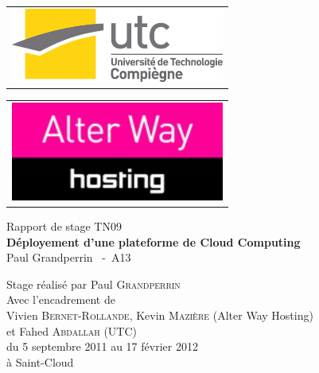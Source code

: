 \begin{titlepage}
 \begin{multicols}{2}
  \begin{flushleft}
   \begin{tabular}[l]{lrl}
    \multicolumn{3}{c}{
     \includegraphics[width=7cm]{resource/img/logo_utc}
    } \\
   \end{tabular}
  \end{flushleft}

	\begin{flushright}
		\begin{tabular}[l]{lrr}
			\multicolumn{3}{c}{
			\includegraphics[width=7cm]{resource/img/logo_awh}
			} \\
		\end{tabular}
	\end{flushright}
 \end{multicols}

 \begin{center}
  \vspace{120pt}
  \LARGE
	Rapport de stage TN09 \\
  \vspace{20pt}
  \Huge
   \textbf{Déployement d'une plateforme de Cloud Computing} \\
  \vspace{20pt}
  \Large
   Paul Grandperrin ~-~A13
 \end{center}

 \vspace{160pt}
 \begin{flushright}
  \normalsize
	Stage réalisé par \large{Paul \textsc{Grandperrin}} \\
	Avec l'encadrement de \\
	\large{Vivien \textsc{Bernet-Rollande}}, \large{Kevin \textsc{Mazière}} (Alter Way Hosting)\\
	et \large{Fahed \textsc{Abdallah}} (UTC) \\
	du 5 septembre 2011 au 17 février 2012 \\
	à Saint-Cloud
 \end{flushright}
\end{titlepage}


\setcounter{page}{0}
\thispagestyle{empty}
\mbox{}
\newpage

